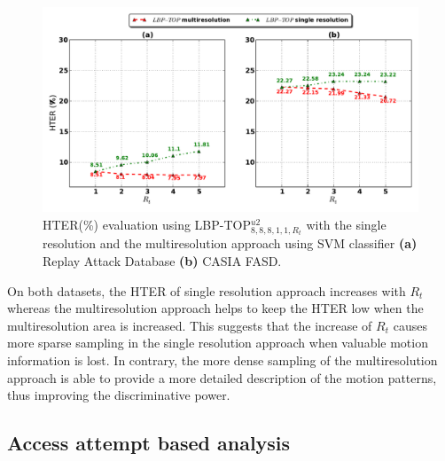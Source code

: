 \begin{figure}[!htb]
\begin{center}
\includegraphics [width=\textwidth] {images/proposed_countermeasure/multiVSsingle.pdf}
\caption[HTER(\%) evaluation using LBP-TOP$_{8,8,8,1,1,R_t}^{u2}$ with the single resolution and the multiresolution approach]{HTER(\%) evaluation using LBP-TOP$_{8,8,8,1,1,R_t}^{u2}$ with the single resolution and the multiresolution approach using SVM classifier \textbf{(a)} Replay Attack Database \textbf{(b)} CASIA FASD.} \label{fig:multiVSsingle}
\end{center}
\end{figure}


On both datasets, the HTER of single resolution approach increases with $R_t$ whereas the multiresolution approach helps to keep the HTER low when the multiresolution area is increased. This suggests that the increase of $R_t$ causes more sparse sampling in the single resolution approach when valuable motion information is lost. In contrary, the more dense sampling of the multiresolution approach is able to provide a more detailed description of the motion patterns, thus improving the discriminative power.


\subsection{Access attempt based analysis}
\label{sec_attempt}

